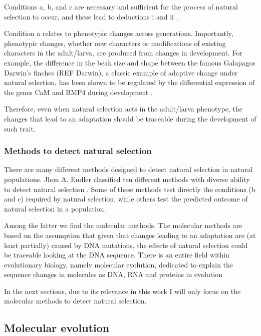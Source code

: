 Conditions a, b, and c are necessary and sufficient for the process of natural selection to occur, and these lead to deductions i and ii \citep{endler1986natural}.

Condition a relates to phenotypic changes across generations. Importantly, phenotypic changes, whether new characters or modifications of existing characters in the adult/larva, are produced from changes in development.
For example, the difference in the beak size and shape between the famous Galapagos Darwin's finches (REF Darwin), a classic example of adaptive change under natural selection, has been shown to be regulated by the differential expression of the genes CaM and BMP4 during development \citep{Abzhanov2006}.

Therefore, even when natural selection acts in the adult/larva phenotype, the changes that lead to an adaptation should be traceable during the development of such trait.

\subsubsection{Methods to detect natural selection}

There are many different methods designed to detect natural selection in natural populations. Jhon A. Endler classified ten different methods with diverse ability to detect natural selection \citep{endler1986natural}. Some of these methods test directly the conditions (b and c) required by natural selection, while others test the predicted outcome of natural selection in a population.

Among the latter we find the molecular methods. The molecular methods are based on the assumption that given that changes leading to an adaptation are (at least partially) caused by DNA mutations, the effects of natural selection could be traceable looking at the DNA sequence.
There is an entire field within evolutionary biology, namely molecular evolution, dedicated to explain the sequence changes in molecules as DNA, RNA and proteins in evolution

In the next sections, due to its relevance in this work I will only focus on the molecular methods to detect natural selection.

\subsection{Molecular evolution}

